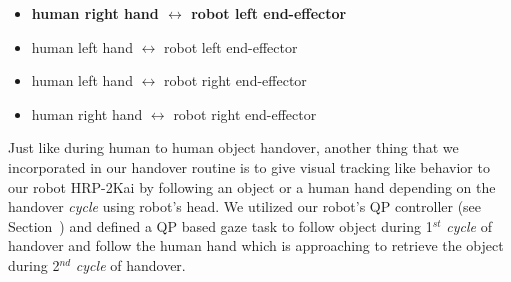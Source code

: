 \begin{itemize}
    \item \textbf{human right hand $\longleftrightarrow$ robot left end-effector}
    \item human left hand $\longleftrightarrow$ robot left end-effector 
    \item human left hand $\longleftrightarrow$  robot right end-effector
    \item human right hand $\longleftrightarrow$ robot right end-effector
\end{itemize}


Just like during human to human object handover, another thing that we incorporated in our handover routine is to give visual tracking like behavior to our robot HRP-2Kai by following an object or a human hand depending on the handover \textit{cycle} using robot's head. We utilized our robot's QP controller (see Section~) and defined a QP based gaze task to follow object during 1$^{st}$ \textit{cycle} of handover and follow the human hand which is approaching to retrieve the object during 2$^{nd}$ \textit{cycle} of handover.

